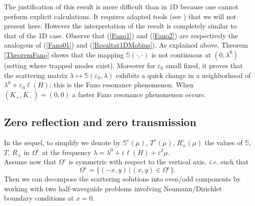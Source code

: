 \documentclass[11pt,a4paper]{report}
\newcommand{\eps}{\varepsilon}
\newcommand{\Om}{\Omega}
\begin{document}
\noindent The justification of this result is more difficult than in 1D because one cannot perform explicit calculations. It requires adapted tools (see \cite{ShVe05,ShTu12,ShWe13,AbSh16,ChNa18}) that we will not present here. However the interpretation of the result is completely similar to that of the 1D case. Observe that (\ref{Fano1}) and  (\ref{Fano2}) are respectively the analogous of (\ref{Fano01}) and (\ref{Resultat1DMobius}). As explained above, Theorem \ref{TheoremFano} shows that the mapping $\mathbb{S}(\cdot,\cdot)$ is not continuous at $(0,\lambda^0)$ (setting where trapped modes exist). Moreover for $\eps_0$ small fixed, it proves that the scattering matrix $\lambda\mapsto \mathbb{S}(\eps_0,\lambda)$ exhibits a quick change in a neighborhood of $\lambda^0+\eps_0\ell(H)$: this is the Fano resonance phenomenon. When $(K_+,K_-)=(0,0)$ a faster Fano resonance phenomenon occurs.\subsection{Zero reflection and zero transmission}
In the sequel, to simplify we denote by $\mathbb{S}^{\eps}(\mu)$, $T^{\eps}(\mu)$, $R^{\eps}_\pm(\mu)$ the values of $\mathbb{S}$, $T$, $R_\pm$ in $\Om^{\eps}$ at the frequency $\lambda=\lambda^0+\eps\ell(H)+\eps^2\mu$.\\
\newline
Assume now that $\Om^{\eps}$ is symmetric with respect to the vertical axis, \textit{i.e.} such that 
\[
\Om^{\eps}=\{(-x,y)\,|\,(x,y)\in\Om^{\eps}\}.
\] 
Then we can decompose the scattering solutions into even/odd components by working with two half-waveguide problems involving Neumann/Dirichlet boundary conditions at $x=0$.
\end{document}
